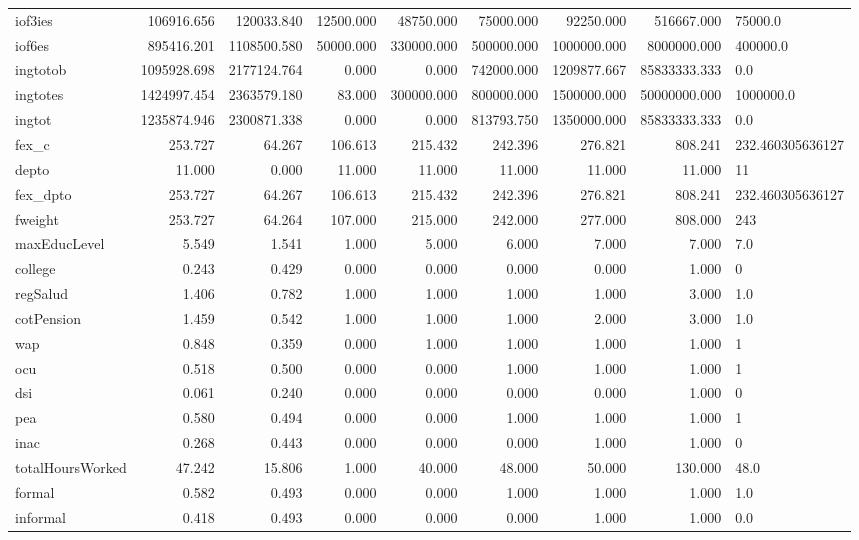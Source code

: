\begin{longtable}{lrrrrrrrl}
iof3ies & 106916.656 & 120033.840 & 12500.000 & 48750.000 & 75000.000 & 92250.000 & 516667.000 & 75000.0 \\
iof6es & 895416.201 & 1108500.580 & 50000.000 & 330000.000 & 500000.000 & 1000000.000 & 8000000.000 & 400000.0 \\
ingtotob & 1095928.698 & 2177124.764 & 0.000 & 0.000 & 742000.000 & 1209877.667 & 85833333.333 & 0.0 \\
ingtotes & 1424997.454 & 2363579.180 & 83.000 & 300000.000 & 800000.000 & 1500000.000 & 50000000.000 & 1000000.0 \\
ingtot & 1235874.946 & 2300871.338 & 0.000 & 0.000 & 813793.750 & 1350000.000 & 85833333.333 & 0.0 \\
fex\_c & 253.727 & 64.267 & 106.613 & 215.432 & 242.396 & 276.821 & 808.241 & 232.460305636127 \\
depto & 11.000 & 0.000 & 11.000 & 11.000 & 11.000 & 11.000 & 11.000 & 11 \\
fex\_dpto & 253.727 & 64.267 & 106.613 & 215.432 & 242.396 & 276.821 & 808.241 & 232.460305636127 \\
fweight & 253.727 & 64.264 & 107.000 & 215.000 & 242.000 & 277.000 & 808.000 & 243 \\
maxEducLevel & 5.549 & 1.541 & 1.000 & 5.000 & 6.000 & 7.000 & 7.000 & 7.0 \\
college & 0.243 & 0.429 & 0.000 & 0.000 & 0.000 & 0.000 & 1.000 & 0 \\
regSalud & 1.406 & 0.782 & 1.000 & 1.000 & 1.000 & 1.000 & 3.000 & 1.0 \\
cotPension & 1.459 & 0.542 & 1.000 & 1.000 & 1.000 & 2.000 & 3.000 & 1.0 \\
wap & 0.848 & 0.359 & 0.000 & 1.000 & 1.000 & 1.000 & 1.000 & 1 \\
ocu & 0.518 & 0.500 & 0.000 & 0.000 & 1.000 & 1.000 & 1.000 & 1 \\
dsi & 0.061 & 0.240 & 0.000 & 0.000 & 0.000 & 0.000 & 1.000 & 0 \\
pea & 0.580 & 0.494 & 0.000 & 0.000 & 1.000 & 1.000 & 1.000 & 1 \\
inac & 0.268 & 0.443 & 0.000 & 0.000 & 0.000 & 1.000 & 1.000 & 0 \\
totalHoursWorked & 47.242 & 15.806 & 1.000 & 40.000 & 48.000 & 50.000 & 130.000 & 48.0 \\
formal & 0.582 & 0.493 & 0.000 & 0.000 & 1.000 & 1.000 & 1.000 & 1.0 \\
informal & 0.418 & 0.493 & 0.000 & 0.000 & 0.000 & 1.000 & 1.000 & 0.0 \\

\end{longtable}
